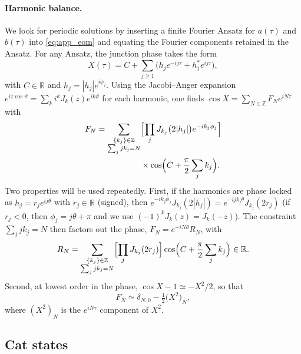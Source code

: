 \documentclass[aps,prx,reprint,floatfix,amsmath,amssymb,longbibliography]{revtex4-2}
\begin{document}
\paragraph*{Harmonic balance.}
We look for periodic solutions by inserting a finite Fourier Ansatz for $a(\tau)$ and $b(\tau)$ into \cref{eq:app_eom} and equating the Fourier components retained in the Ansatz. For any Ansatz, the junction phase takes the form
\begin{equation}
    X(\tau) = C + \sum_{j\ge1}\bigl(h_j e^{-ij\tau} + h_j^* e^{ij\tau}\bigr),
\end{equation}
with $C\in\mathbb R$ and $h_j = |h_j|e^{i\phi_j}$.
Using the Jacobi--Anger expansion $e^{iz\cos\vartheta}=\sum_{k} i^k J_k(z)e^{ik\vartheta}$ for each harmonic, one finds $\cos X=\sum_{N\in\mathbb Z}F_N e^{iN\tau}$ with
\begin{equation}
\begin{split}
    F_N = \sum_{\substack{\{k_j\}\in\mathbb Z\\ \sum_j j k_j = N}}
    &\Bigl[\prod_j J_{k_j}\bigl(2|h_j|\bigr)e^{-ik_j\phi_j}\Bigr]\\
    &\times\cos\Bigl(C + \frac{\pi}{2}\sum_j k_j\Bigr).
\end{split}
\label{eq:app_FN}
\end{equation}
Two properties will be used repeatedly. First, if the harmonics are phase locked as $h_j = r_j e^{ij\theta}$ with $r_j\in\mathbb R$ (signed), then $e^{-ik_j\phi_j}J_{k_j}(2|h_j|)=e^{-ijk_j\theta}J_{k_j}(2r_j)$ (if $r_j<0$, then $\phi_j=j\theta+\pi$ and we use $(-1)^kJ_k(z)=J_k(-z)$). The constraint $\sum_j jk_j=N$ then factors out the phase, $F_N = e^{-iN\theta}R_N$, with
\begin{equation}
    R_N = \sum_{\substack{\{k_j\}\in\mathbb Z\\ \sum_j j k_j = N}}
    \Bigl[\prod_j J_{k_j}(2r_j)\Bigr]
    \cos\Bigl(C + \frac{\pi}{2}\sum_j k_j\Bigr)\in\mathbb R .
    \label{eq:app_RN_general}
\end{equation} Second, at lowest order in the phase, $\cos X-1\simeq -X^2/2$, so that
\begin{equation}
    F_N \simeq \delta_{N,0} - \tfrac12\bigl(X^2\bigr)_N,
    \label{eq:app_FN_quad}
\end{equation}
where $(X^2)_N$ is the $e^{iN\tau}$ component of $X^2$.

\subsection{Cat states}
\label{app:cat}
\end{document}
